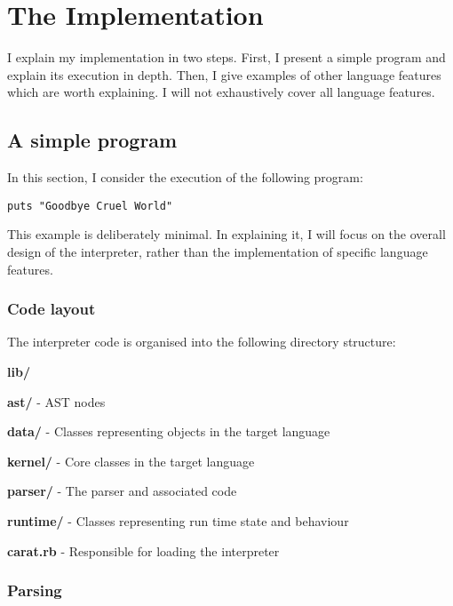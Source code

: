 \section{The Implementation}

I explain my implementation in two steps. First, I present a simple program and explain its execution in depth. Then, I give examples of other language features which are worth explaining. I will not exhaustively cover all language features.

\subsection{A simple program}

In this section, I consider the execution of the following program:

\begin{lstlisting}
puts "Goodbye Cruel World"
\end{lstlisting}

This example is deliberately minimal. In explaining it, I will focus on the overall design of the interpreter, rather than the implementation of specific language features.

\subsubsection{Code layout}

The interpreter code is organised into the following directory structure:

\begin{dirlist}
  \item \textbf{lib/}
    \begin{dirlist}
      \item \textbf{ast/} - AST nodes
      \item \textbf{data/} - Classes representing objects in the target language
      \item \textbf{kernel/} - Core classes in the target language
      \item \textbf{parser/} - The parser and associated code
      \item \textbf{runtime/} - Classes representing run time state and behaviour
      \item \textbf{carat.rb} - Responsible for loading the interpreter
    \end{dirlist}
\end{dirlist}

\subsubsection{Parsing}

